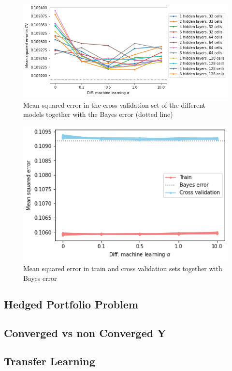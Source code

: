 \begin{figure}[H] 
\centering
\includegraphics[width=1.0\textwidth]{Figures/MarketRisk/MSE_CV.png}
\caption{Mean squared error in the cross validation set of the different models together with the Bayes error (dotted line)}
\label{fig:MSE_CV}
\end{figure}


\begin{figure}[H] 
\centering
\includegraphics[width=1.0\textwidth]{Figures/MarketRisk/train_test_mse.png}
\caption{Mean squared error in train and cross validation sets together with Bayes error}
\label{fig:MSE_CV}
\end{figure}

\cite{dirac}

\cite{einstein}





\subsection{Hedged Portfolio Problem}
\subsection{Converged vs non Converged Y}
\subsection{Transfer Learning}





